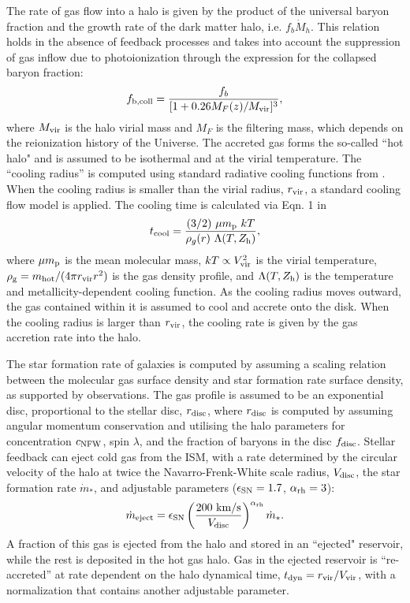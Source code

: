 \documentclass[fleqn,usenatbib]{mnras}
\begin{document}
The rate of gas flow into a halo is given by the product of the universal baryon fraction and the growth rate of the dark matter halo, i.e. $f_b \dot M_h$. This relation holds in the absence of feedback processes and takes into account the suppression of gas inflow due to photoionization through the expression for the collapsed baryon fraction:
\begin{equation}
  f_{\rm b, coll} = \frac{f_b}{[1+0.26 M_F(z)/M_{\rm vir}]^3},    
\end{equation} 
where $M_{\rm vir}$ is the halo virial mass and $M_F$ is the filtering mass, which depends on the reionization history of the Universe. The accreted gas forms the so-called ``hot halo" and is assumed to be isothermal and at the virial temperature. The ``cooling radius'' is computed using standard radiative cooling functions from \citet{1993ApJS...88..253S}. When the cooling radius is smaller than the virial radius, $r_{\rm vir}$, a standard cooling flow model is applied. The cooling time is calculated via  Eqn. 1 in \citet{2008MNRAS.391..481S}
\begin{equation}
   t_{\rm cool} = \frac{(3/2) \ \mu m_{\rm p} \ k T}{\rho_g(r) \ \Lambda(T, Z_{\rm h})} ,
\end{equation}
where $\mu m_{\rm p}$ is the mean molecular mass, $k T \propto V_{\rm vir}^2$ is the virial temperature, $\rho_{\rm g} = m_{\rm hot}/(4 \pi r_{\rm vir} r^2)$ is the gas density profile, and $\Lambda (T, Z_{\rm h})$ is the temperature and metallicity-dependent cooling function. As the cooling radius moves outward, the gas contained within it is assumed to cool and accrete onto the disk. 
When the cooling radius is larger than $r_{\rm vir}$, the cooling rate is given by the gas accretion rate into the halo. 

The star formation rate of galaxies is computed by assuming a scaling relation between the molecular gas surface density and star formation rate surface density, as supported by observations. The gas profile is assumed to be an exponential disc, proportional to the stellar disc, $r_{\rm disc}$, where $r_{\rm disc}$ is computed by assuming angular momentum conservation and utilising the halo parameters for concentration $c_{\rm NFW}$, spin $\lambda$, and the fraction of baryons in the disc $f_{\rm disc}$. Stellar feedback can eject cold gas from the ISM, with a rate determined by the circular velocity of the halo at twice the Navarro-Frenk-White \citep[NFW,][]{1996ApJ...462..563N} scale radius, $V_{\rm disc}$, the star formation rate $\dot m_{\ast}$, and adjustable parameters ($\epsilon_{\rm SN} = 1.7$, $\alpha_{\rm rh} = 3$): 
\begin{equation}
  \dot m_{\rm eject} = \epsilon_{\rm SN} \left( \frac{200 \ {\rm km/s}}{V_{\rm disc}} \right)^{\alpha_{\rm rh}} \dot m_{\ast} .    
\end{equation}
A fraction of this gas is ejected from the halo and stored in an ``ejected" reservoir, while the rest is deposited in the hot gas halo. Gas in the ejected reservoir is
``re-accreted'' at rate dependent on the halo dynamical time, $t_{\rm dyn} = r_{\rm vir}/V_{\rm vir}$, with a normalization that contains another adjustable parameter.
\end{document}
